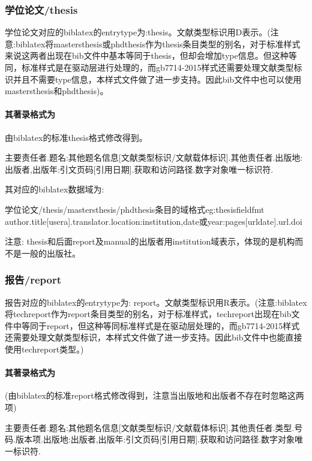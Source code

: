 \subsubsection{学位论文/thesis}
\begin{refentry}{}{}
学位论文对应的biblatex的entrytype为:thesis。文献类型标识用D表示。(注意:biblatex将mastersthesis或phdthesis作为thesis条目类型的别名，对于标准样式来说这两者出现在bib文件中基本等同于thesis，但却会增加type信息。但这种等同，标准样式是在驱动层进行处理的，而gb7714-2015样式还需要处理文献类型标识并且不需要type信息，本样式文件做了进一步支持。因此bib文件中也可以使用mastersthesis和phdthesis)。

\paragraph{其著录格式为} 由biblatex的标准thesis格式修改得到。

主要责任者.题名:其他题名信息[文献类型标识/文献载体标识].其他责任者.出版地:出版者,出版年:引文页码[引用日期].获取和访问路径.数字对象唯一标识符.
\end{refentry}

其对应的biblatex数据域为:
\begin{codetex}{学位论文/thesis/mastersthesis/phdthesis条目的域格式}{eg:thesisfieldfmt}
author.title[usera].translator.location:institution,date或year:pages[urldate].url.doi
\end{codetex}

注意: thesis和后面report及manual的出版者用institution域表示，体现的是机构而不是一般的出版社。

\subsubsection{报告/report}
\begin{refentry}{}{}
报告对应的biblatex的entrytype为: report。文献类型标识用R表示。(注意:biblatex将techreport作为report条目类型的别名，对于标准样式，techreport出现在bib文件中等同于report，但这种等同标准样式是在驱动层处理的，而gb7714-2015样式还需要处理文献类型标识，本样式文件做了进一步支持。因此bib文件中也能直接使用techreport类型。)

\paragraph{其著录格式为} (由biblatex的标准report格式修改得到，注意当出版地和出版者不存在时忽略这两项)

主要责任者.题名:其他题名信息[文献类型标识/文献载体标识].其他责任者.类型.号码.版本项.出版地:出版者,出版年:引文页码[引用日期].获取和访问路径.数字对象唯一标识符.
\end{refentry}

